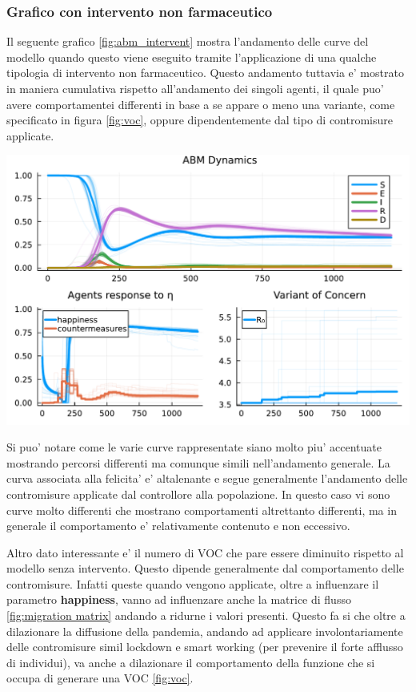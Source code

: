\subsubsection*{Grafico con intervento non farmaceutico}

Il seguente grafico \ref{fig:abm_intervent} mostra l'andamento delle curve del modello
quando questo viene eseguito tramite l'applicazione di una qualche tipologia di intervento non farmaceutico. 
Questo andamento tuttavia e' mostrato in maniera cumulativa rispetto all'andamento dei singoli agenti, il quale puo' avere comportamentei 
differenti in base a se appare o meno una variante, come specificato in figura \ref{fig:voc}, oppure 
dipendentemente dal tipo di contromisure applicate. 

\begin{minipage}{\linewidth}
	\centering
	\includegraphics[width=\textwidth]{img/SocialNetworkABM_CONTROL.pdf}
	\label{fig:abm_intervent}
\end{minipage}

Si puo' notare come le varie curve rappresentate siano molto piu' accentuate mostrando percorsi differenti 
ma comunque simili nell'andamento generale. La curva associata alla felicita' e' altalenante e segue generalmente
l'andamento delle contromisure applicate dal controllore alla popolazione. In questo caso vi sono curve
molto differenti che mostrano comportamenti altrettanto differenti, ma in generale il comportamento e' 
relativamente contenuto e non eccessivo. 

Altro dato interessante e' il numero di VOC che pare essere diminuito rispetto al modello senza intervento.
Questo dipende generalmente dal comportamento delle contromisure. Infatti queste quando vengono applicate, 
oltre a influenzare il parametro \textbf{happiness}, vanno ad influenzare anche la matrice di flusso \ref{fig:migration matrix}
andando a ridurne i valori presenti. Questo fa si che oltre a dilazionare la diffusione della pandemia, andando 
ad applicare involontariamente delle contromisure simil lockdown e smart working (per prevenire il forte afflusso di individui),
va anche a dilazionare il comportamento della funzione che si occupa di generare una VOC \ref{fig:voc}. 

